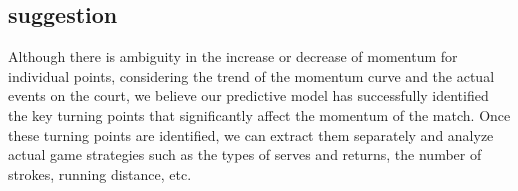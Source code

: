 \documentclass[12pt]{article}  %
\begin{document}
\begin{table}[ht]
    \centering
    \caption{Tennis Match Detailed Analysis}
    \label{tab:tennis_analysis}
    \end{table}

\clearpage
\subsection{suggestion}
Although there is ambiguity in the increase or decrease of
momentum for individual points, considering the trend of 
the momentum curve and the actual events on the court, we 
believe our predictive model has successfully identified 
the key turning points that significantly affect the 
momentum of the match. Once these turning points are 
identified, we can extract them separately and analyze 
actual game strategies such as the types of serves and 
returns, the number of strokes, running distance, etc.
\end{document}
